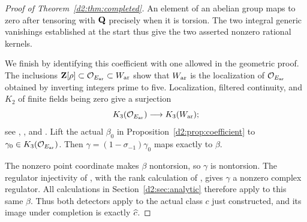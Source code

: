 \begin{proof}[Proof of Theorem~\ref{d2:thm:completed}]
An element of an abelian group maps to zero after tensoring with
\(\mathbf{Q}\) precisely when it is torsion.
The two integral generic vanishings established at the start thus
give the two asserted nonzero rational kernels.

We finish by identifying this coefficient with one allowed in the
geometric proof. The inclusions
\(\mathbf{Z}[\rho]\subset\mathcal O_{E_{\mathrm{ar}}}\subset W_{\mathrm{ar}}\) show that
\(W_{\mathrm{ar}}\) is the localization of \(\mathcal O_{E_{\mathrm{ar}}}\) obtained by
inverting integers prime to five.
Localization, filtered continuity, and
\(K_2\) of finite fields being zero give a surjection
\[
 K_3(\mathcal O_{E_{\mathrm{ar}}})\longrightarrow K_3(W_{\mathrm{ar}});
\]
see \cite[V.6.1]{Weibel},
\cite[IV, Section~6.4]{Weibel}, and
\cite{QuillenFinite}\cite[IV, Corollary~1.13]{Weibel}.
Lift the actual \(\beta_0\) in
Proposition~\ref{d2:prop:coefficient} to
\(\gamma_0\in K_3(\mathcal O_{E_{\mathrm{ar}}})\).
Then \(\gamma=(1-\sigma_{-1})\gamma_0\) maps exactly to \(\beta\).

The nonzero point coordinate makes \(\beta\) nontorsion, so
\(\gamma\) is nontorsion.
The regulator injectivity of
\cite[Section~6]{BunkeTamme}, with the rank calculation of
\cite[Proposition~12.2]{Borel}, gives \(\gamma\) a nonzero
complex regulator.
All calculations in Section~\ref{d2:sec:analytic} therefore apply to
this same \(\beta\).
Thus both detectors apply to the actual class \(c\) just constructed,
and its image under completion is exactly \(\widehat c\).
\end{proof}
